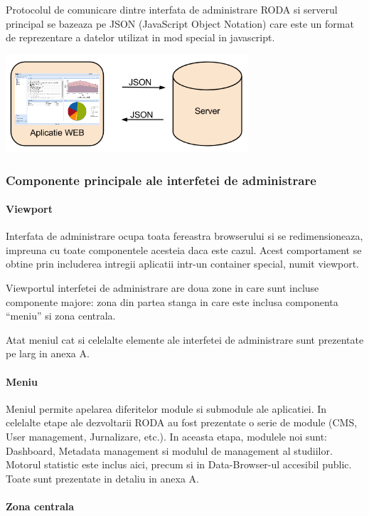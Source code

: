 \documentclass[a4paper, 10pt]{article}
\begin{document}
{Protocolul de comunicare dintre interfata de administrare RODA si
serverul principal se bazeaza pe JSON (JavaScript Object Notation)
care este un format de reprezentare a datelor utilizat in mod special
in javascript. 

\includegraphics[width=9cm]{img/json}

\subsubsection{Componente principale ale interfetei de administrare}

\paragraph{Viewport }

Interfata de administrare ocupa toata fereastra browserului si se
redimensioneaza, impreuna cu toate componentele acesteia daca este
cazul. Acest comportament se obtine prin includerea intregii aplicatii
intr-un container special, numit viewport.

Viewportul interfetei de administrare are doua zone in care sunt incluse
componente majore: zona din partea stanga in care este inclusa componenta
\textquotedblleft{}meniu\textquotedblright{} si zona centrala.

Atat meniul cat si celelalte elemente ale interfetei de administrare
sunt prezentate pe larg in anexa A. 

\paragraph{Meniu}

Meniul permite apelarea diferitelor module si submodule ale aplicatiei.
In celelalte etape ale dezvoltarii RODA au fost prezentate o serie
de module (CMS, User management, Jurnalizare, etc.). 
In aceasta etapa, modulele noi sunt: 
Dashboard, Metadata management si modulul de management al studiilor. 
Motorul statistic este inclus aici, precum si in Data-Browser-ul accesibil public.
Toate sunt prezentate in detaliu in anexa A. 

\paragraph{Zona centrala}

}
\end{document}
